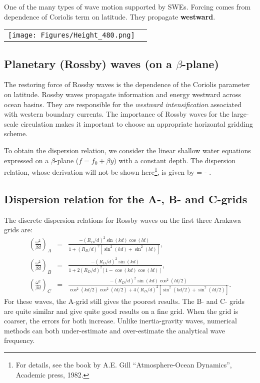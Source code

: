 One of the many types of wave motion supported by SWEs. Forcing comes from dependence of Coriolis term on latitude. They propagate {\bf westward}.
\begin{center}
	\begin{tabular}{cc}
		\texttt{[image: Figures/Height\_480.png]}
	\end{tabular}
\end{center}


\subsection{Planetary (Rossby) waves (on a $\beta$-plane)}

The restoring force of Rossby waves is the dependence of the Coriolis parameter on latitude. Rossby waves propagate information and energy westward across ocean basins. They are responsible for the \emph{westward intensification} associated with western boundary currents. The importance of Rossby waves for the large-scale circulation makes it important to choose an appropriate horizontal gridding scheme.

\vspace{0.2cm} To obtain the dispersion relation, we consider the linear shallow water equations expressed on a $\beta$-plane ($f=f_0 + \beta y$) with a constant depth. The dispersion relation, whose derivation will not be shown here\footnote{\BTi For details, see the book by A.E. Gill ``Atmosphere-Ocean Dynamics'', Academic press, 1982.\ETi}, is given by
\BEQ
\omega = - .
\EEQ


\subsection{Dispersion relation for the A-, B- and C-grids}

The discrete dispersion relations for Rossby waves on the first three Arakawa grids are:
\begin{eqnarray}
	\left(\frac{\omega^2}{\beta d}\right)_A &=& \frac{-(R_D/d)^2 \sin(kd)\cos(ld)}{1 + (R_D/d)^2 \left[ \sin^2(kd) + \sin^2(ld) \right]},
	\\
	\left(\frac{\omega^2}{\beta d}\right)_B &=& \frac{-(R_D/d)^2 \sin(kd)}{1 + 2(R_D/d)^2 \left[1 - \cos(kd)\cos(ld) \right]},
	\\
	\left(\frac{\omega^2}{\beta d}\right)_C &=& \frac{-(R_D/d)^2 \sin(kd)\cos^2(ld/2)}{\cos^2(kd/2)\cos^2(ld/2) + 4(R_D/d)^2 \left[ \sin^2(kd/2) + \sin^2(ld/2) \right]}.
\end{eqnarray}
For these waves, the A-grid still gives the poorest results. The B- and C- grids are quite similar and give quite good results on a fine grid. When the grid is coarser, the errors for both increase. Unlike inertia-gravity waves, numerical methods can both under-estimate and over-estimate the analytical wave frequency.


